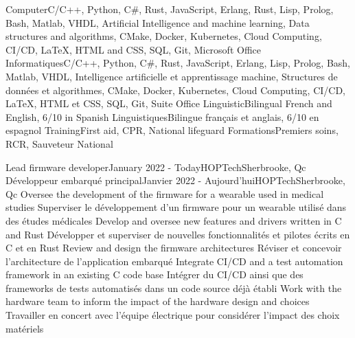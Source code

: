     \resumeEnumerationStart
        \resumeEnumerationEnFr
            {Computer}{C/C++, Python, C\#, Rust, JavaScript, Erlang, Rust, Lisp, Prolog, Bash, Matlab, VHDL, Artificial Intelligence and machine learning, Data structures and algorithms, CMake, Docker, Kubernetes, Cloud Computing, CI/CD, LaTeX, HTML and CSS, SQL, Git, Microsoft Office}
            {Informatiques}{C/C++, Python, C\#, Rust, JavaScript, Erlang, Lisp, Prolog, Bash, Matlab, VHDL, Intelligence artificielle et apprentissage machine, Structures de données et algorithmes, CMake, Docker, Kubernetes, Cloud Computing, CI/CD, LaTeX, HTML et CSS, SQL, Git, Suite Office}
        \resumeEnumerationEnFr
            {Linguistic}{Bilingual French and English, 6/10 in Spanish}
            {Linguistiques}{Bilingue français et anglais, 6/10 en espagnol}
        \resumeEnumerationEnFr
            {Training}{First aid, CPR, National lifeguard}
            {Formations}{Premiers soins, RCR, Sauveteur National}
    \resumeEnumerationEnd


  \resumeSubHeadingListStart
      \resumeSubheadingEnFr
        {Lead firmware developer}{January 2022 - Today}{HOPTech}{Sherbrooke, Qc}
        {Développeur embarqué principal}{Janvier 2022 - Aujourd'hui}{HOPTech}{Sherbrooke, Qc}
            \resumeItemListStart
                \resumeItemEnFr
                    {Oversee the development of the firmware for a wearable used in medical studies}
                    {Superviser le développement d'un firmware pour un wearable utilisé dans des études médicales}
                \resumeItemEnFr
                    {Develop and oversee new features and drivers written in C and Rust}
                    {Développer et superviser de nouvelles fonctionnalités et pilotes écrits en C et en Rust}
                \resumeItemEnFr
                    {Review and design the firmware architectures}
                    {Réviser et concevoir l'architecture de l'application embarqué}
                \resumeItemEnFr
                    {Integrate CI/CD and a test automation framework in an existing C code base}
                    {Intégrer du CI/CD ainsi que des frameworks de tests automatisés dans un code source déjà établi}
                \resumeItemEnFr
                    {Work with the hardware team to inform the impact of the hardware design and choices}
                    {Travailler en concert avec l'équipe électrique pour considérer l'impact des choix matériels}
            \resumeItemListEnd
  
